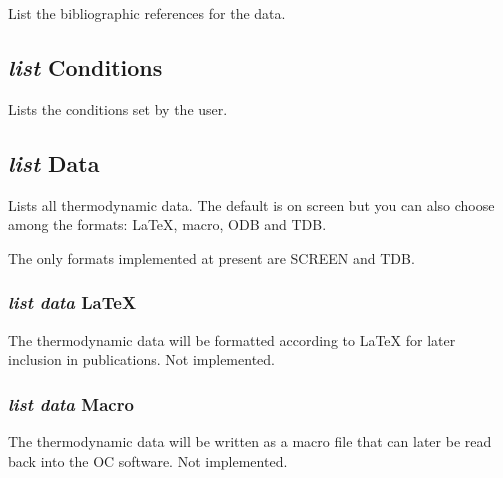 \documentclass[12pt]{article}
\begin{document}
List the bibliographic references for the data.

\subsection{{\em list} Conditions}

Lists the conditions set by the user.

\subsection{{\em list} Data}

Lists all thermodynamic data.  The default is on screen but you can
also choose among the formats: LaTeX, macro, ODB and TDB.

The only formats implemented at present are SCREEN and TDB.

\subsubsection{{\em list data} LaTeX}

The thermodynamic data will be formatted according to LaTeX for later
inclusion in publications.  Not implemented.

\subsubsection{{\em list data} Macro}

The thermodynamic data will be written as a macro file that can later
be read back into the OC software.  Not implemented.

\end{document}
